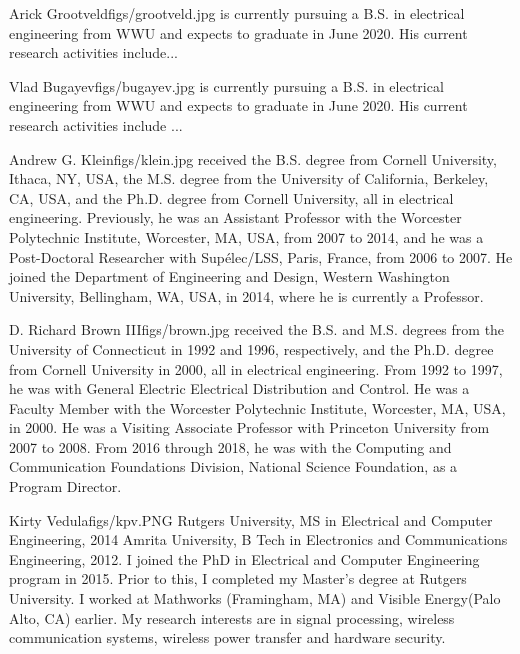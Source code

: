 \documentclass[twocolumn,letterpaper]{IEEEAerospaceCLS}  %
\begin{document}
\newpage



\newpage
\thebiography
\begin{biographywithpic}
{Arick Grootveld}{figs/grootveld.jpg}
is currently pursuing a B.S. in electrical engineering from WWU and expects to graduate in June 2020. His current research activities include... 
\lipsum[1-1]
\end{biographywithpic}

\begin{biographywithpic}
{Vlad Bugayev}{figs/bugayev.jpg}
is currently pursuing a B.S. in electrical engineering from WWU and expects to graduate in June 2020. His current research activities include ...
\lipsum[1-1]
\end{biographywithpic}

\begin{biographywithpic}
{Andrew G. Klein}{figs/klein.jpg}
received the B.S. degree from Cornell University, Ithaca,
NY, USA, the M.S. degree from the University of
California, Berkeley, CA, USA, and the Ph.D.
degree from Cornell University, all in electrical
engineering. Previously, he was an Assistant Professor with the Worcester Polytechnic Institute,
Worcester, MA, USA, from 2007 to 2014, and he
was a Post-Doctoral Researcher with Sup\'{e}lec/LSS,
Paris, France, from 2006 to 2007. He joined the
Department of Engineering and Design, Western
Washington University, Bellingham, WA, USA, in 2014, where he is currently
a Professor.
\end{biographywithpic}

\begin{biographywithpic}
{D. Richard Brown III}{figs/brown.jpg}
received the B.S. and M.S. degrees from the University of Connecticut in 1992 and 1996, respectively, and the Ph.D. degree from Cornell University
in 2000, all in electrical engineering. From 1992
to 1997, he was with General Electric Electrical
Distribution and Control. He was a Faculty Member
with the Worcester Polytechnic Institute, Worcester,
MA, USA, in 2000. He was a Visiting Associate
Professor with Princeton University from 2007 to
2008. From 2016 through 2018, he was with the Computing
and Communication Foundations Division, National Science Foundation, as
a Program Director.
\end{biographywithpic}

\begin{biographywithpic}
{Kirty Vedula}{figs/kpv.PNG}
Rutgers University, MS in Electrical and Computer Engineering, 2014 Amrita University, B Tech in Electronics and Communications Engineering, 2012. I joined the PhD in Electrical and Computer Engineering program in 2015. Prior to this, I completed my Master's degree at Rutgers University. I worked at Mathworks (Framingham, MA) and Visible Energy(Palo Alto, CA) earlier. My research interests are in signal processing, wireless communication systems, wireless power transfer and hardware security.
\end{biographywithpic}
\end{document}
